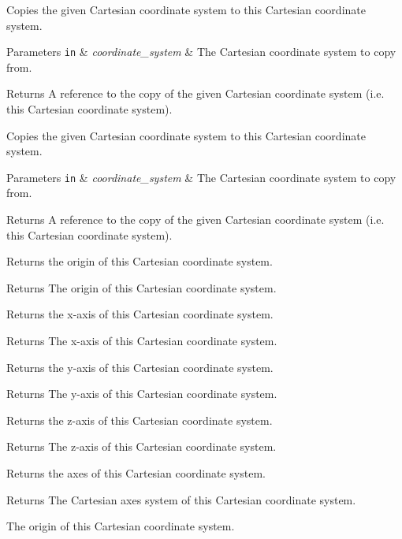 Copies the given Cartesian coordinate system to this Cartesian coordinate system.


\begin{DoxyParams}[1]{Parameters}
\mbox{\tt in}  & {\em coordinate\+\_\+system} & The Cartesian coordinate system to copy from. \\
\hline
\end{DoxyParams}
\begin{DoxyReturn}{Returns}
A reference to the copy of the given Cartesian coordinate system (i.\+e. this Cartesian coordinate system).
\end{DoxyReturn}
Copies the given Cartesian coordinate system to this Cartesian coordinate system.


\begin{DoxyParams}[1]{Parameters}
\mbox{\tt in}  & {\em coordinate\+\_\+system} & The Cartesian coordinate system to copy from. \\
\hline
\end{DoxyParams}
\begin{DoxyReturn}{Returns}
A reference to the copy of the given Cartesian coordinate system (i.\+e. this Cartesian coordinate system).
\end{DoxyReturn}
Returns the origin of this Cartesian coordinate system.

\begin{DoxyReturn}{Returns}
The origin of this Cartesian coordinate system.
\end{DoxyReturn}
Returns the x-\/axis of this Cartesian coordinate system.

\begin{DoxyReturn}{Returns}
The x-\/axis of this Cartesian coordinate system.
\end{DoxyReturn}
Returns the y-\/axis of this Cartesian coordinate system.

\begin{DoxyReturn}{Returns}
The y-\/axis of this Cartesian coordinate system.
\end{DoxyReturn}
Returns the z-\/axis of this Cartesian coordinate system.

\begin{DoxyReturn}{Returns}
The z-\/axis of this Cartesian coordinate system.
\end{DoxyReturn}
Returns the axes of this Cartesian coordinate system.

\begin{DoxyReturn}{Returns}
The Cartesian axes system of this Cartesian coordinate system.
\end{DoxyReturn}
The origin of this Cartesian coordinate system.

